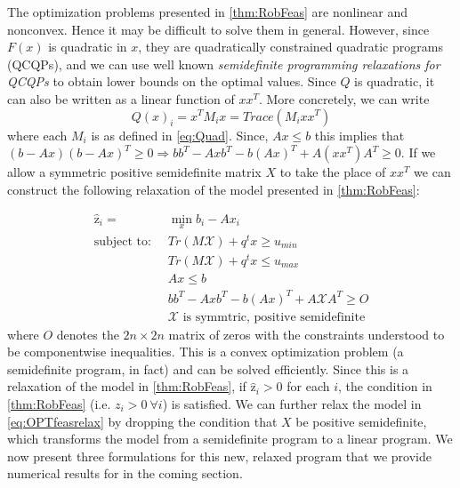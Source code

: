 \documentclass[11pt]{article}
\theoremstyle{plain}
\theoremstyle{definition}
\theoremstyle{remark}
\begin{document}


The optimization problems presented in \cref{thm:RobFeas} are nonlinear and nonconvex.
Hence it may be difficult to solve them in general.
However, since $F(x)$ is quadratic in $x$, they are quadratically constrained quadratic programs (QCQPs), and we can use well known \emph{semidefinite programming relaxations for QCQPs} %
to obtain lower bounds on the optimal values.
Since $Q$ is quadratic, it can also be written as a linear function of $xx^T$.
More concretely, we can write
$$Q(x)_i=x^TM_ix=Trace(M_ixx^T)$$
where each $M_i$ is as defined in \eqref{eq:Quad}. 
Since, $Ax\leq b$ this implies that $(b-Ax)(b-Ax)^T\geq 0\Rightarrow bb^T-Axb^T-b(Ax)^T+A(xx^T)A^T\geq 0$. 
If we allow a symmetric positive semidefinite matrix $X$ to take the place of $xx^T$ we can construct the following relaxation of the model presented in \cref{thm:RobFeas}:
 
\begin{subequations}\label{eq:OPTfeasrelax}
\begin{align}
\hat{\mathrm{z}}_{i} = &\min_x b_i-Ax_i  \\
 \text{subject to: } \ &Tr\left(M\mathcal{X}\right)+q^tx \geq u_{min} \\
 & Tr\left(M\mathcal{X}\right)+q^tx \leq u_{max} \\
 	&Ax\leq b \\
 	&bb^T-Axb^T-b(Ax)^T+A\mathcal{X}A^T\geq O \\
 	&\mathcal{X} \text{ is symmtric, positive semidefinite}
\end{align}
\end{subequations}
where $O$ denotes the $2n \times 2n$ matrix of zeros with the constraints understood to be componentwise inequalities. This is a convex optimization problem (a semidefinite program, in fact) and can be solved efficiently. Since this is a relaxation of the model in \cref{thm:RobFeas}, if $\hat{\mathrm{z}}_i>0$ for each $i$, the condition in \cref{thm:RobFeas} (i.e. $z_i>0 \ \forall i$) is satisfied. We can further relax the model in \eqref{eq:OPTfeasrelax} by dropping the condition that $X$ be positive semidefinite, which transforms the model from a semidefinite program to a linear program. We now present three formulations for this new, relaxed program that we provide numerical results for in the coming section.
\end{document}

